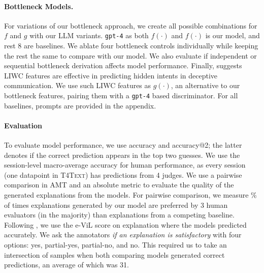 \paragraph{Bottleneck Models.} For variations of our bottleneck approach, we create all possible combinations for $f$ and $g$ with our LLM variants. \texttt{gpt-4} as both $f(\cdot)$ and $f(\cdot)$ is our model, and rest 8 are baselines. We ablate four bottleneck controls individually while keeping the rest the same to compare with our model.
We also evaluate if independent or sequential bottleneck derivation affects model performance. Finally, \citet{soldner2019box} suggests LIWC features \cite{ott2013negative} are effective in predicting hidden intents in deceptive communication. We use such LIWC features as $g(\cdot)$, an alternative to our bottleneck features, pairing them with a \texttt{gpt-4} based discriminator. For all baselines, prompts are provided in the appendix.


\paragraph{Evaluation}
To evaluate model performance, we use accuracy and accuracy@2; the latter denotes if the correct prediction appears in the top two guesses. We use the session-level macro-average accuracy for human performance, as every session (one datapoint in \textsc{T4Text}) has predictions from 4 judges. We use a pairwise comparison in AMT and an absolute metric to evaluate the quality of the generated explanations from the models. For pairwise comparison, we measure \% of times explanations generated by our model are preferred by 3 human evaluators (in the majority) than explanations from a competing baseline. Following \citet{Majumder2021KnowledgeGroundedSV}, we use the e-ViL score on explanation where the models predicted accurately. We ask the annotators \emph{if an explanation is satisfactory} with four options: yes, partial-yes, partial-no, and no. This required us to take an intersection of samples when both comparing models generated correct predictions, an average of which was 31.

